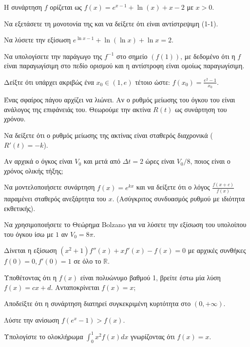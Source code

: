\documentclass[a4paper,11pt,twoside]{article}
\newcommand{\kerkissans}[1]{{\fontfamily{maksf}\selectfont {#1}}}
\newcommand\themanum{A}
\newcounter{thema}[section]
\renewcommand{\thethema}{\arabic{thema}}
\newcommand{\Thema}{\refstepcounter{thema}{\textbf{\textcolor{black}{\faPenSquare\ \  \large \kerkissans{\textbf{\thethemaο\hspace{2mm}Θέμα}}}}}\hspace{0mm}}{}
\newenvironment{thema}[1]
{\begin{tcolorbox}[title=\Thema\kerkissans{\textbf{\large{  #1}}},breakable,
enhanced standard,titlerule=0pt,toprule=0pt, rightrule=0pt, bottomrule=0pt,
colback=white,left=0mm,top=1mm,bottom=0mm,
boxrule=0pt,
colframe=white,leftrule=0mm,sharp corners,coltitle=black]
\renewcommand{\themanum}{#1}}
{\end{tcolorbox}}
\newcommand{\dint}{\displaystyle\int}
\begin{document}
\begin{thema}{Δ}
Η συνάρτηση $f$ ορίζεται ως $f(x) = e^{x-1} + \ln(x) + x - 2$ με $x>0$.
\begin{erwthma}
    \item Να εξετάσετε τη μονοτονία της και να δείξετε ότι είναι αντίστρεψιμη (1-1). 
    \item Να λύσετε την εξίσωση $e^{\ln x - 1} + \ln(\ln x) + \ln x = 2$.
    \item Να υπολογίσετε την παράγωγο της $f^{-1}$ στο σημείο $(f(1))$, με δεδομένο ότι η $f$ είναι παραγωγίσιμη στο πεδίο ορισμού και η αντίστροφη είναι ομοίως παραγωγίσιμη.
    \item Δείξτε ότι υπάρχει ακριβώς ένα $x_0 \in (1, e)$ τέτοιο ώστε: $f(x_0) = \frac{e^2 - 1}{x_0}$.
\end{erwthma}
\end{thema}

\begin{thema}{Δ}
Ένας σφαίρος πάγου αρχίζει να λιώνει. Αν ο ρυθμός μείωσης του όγκου του είναι ανάλογος της επιφάνειάς του. Θεωρούμε την ακτίνα $R(t)$ ως συνάρτηση του χρόνου.
\begin{erwthma}
    \item Να δείξετε ότι ο ρυθμός μείωσης της ακτίνας είναι σταθερός διαχρονικά ($R'(t) = -k$).
    \item Αν αρχικά ο όγκος είναι $V_0$ και μετά από $\Delta t = 2$ ώρες είναι $V_0 / 8$, ποιος είναι ο χρόνος ολικής τήξης;
    \item Να μοντελοποιήσετε συνάρτηση $f(x) = e^{k x}$ και να δείξετε ότι ο λόγος $\frac{f(x+c)}{f(x)}$ παραμένει σταθερός ανεξάρτητα του $x$. (Ασύγκριτος συνδυασμός ρυθμού με ιδιότητα εκθετικής).
    \item Να χρησιμοποιήσετε το Θεώρημα Bolzano για να λύσετε την εξίσωση του υπολοίπου του όγκου ίσω με $1$ αν $V_0 = 8\pi$.
\end{erwthma}
\end{thema}

\begin{thema}{Δ}
Δίνεται η εξίσωση $(x^2+1) f''(x) + x f'(x) - f(x) = 0$ με αρχικές συνθήκες $f(0)=0, f'(0)=1$ σε όλο το $\mathbb{R}$.
\begin{erwthma}
    \item Υποθέτοντας ότι η $f(x)$ είναι πολυώνυμο βαθμού 1, βρείτε έστω μία λύση $f(x) = c x + d$. Ανταποκρίνεται $f(x)=x$;
    \item Αποδείξτε ότι η συνάρτηση διατηρεί συγκεκριμένη κυρτότητα στο $(0, +\infty)$.
    \item Λύστε την ανίσωση $f(e^x - 1) > f(x)$.
    \item Υπολογίστε το ολοκλήρωμα $\dint_0^1 x^2 f(x) dx$ γνωρίζοντας ότι $f(x)=x$.
\end{erwthma}
\end{thema}
\end{document}
